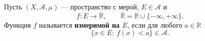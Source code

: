 \label{definition:21}

\begin{definition}
Пусть $(X,\mathcal A,\mu)$ --- пространство с мерой, $E\in\mathcal A$ и
\[
  f:E\to\overline{\mathbb R},
  \qquad \overline{\mathbb R}=\mathbb R\cup\{-\infty,+\infty\}.
\]
Функция $f$ называется \textbf{измеримой на $E$}, если для любого $a\in\mathbb R$
\[
  \{x\in E:\ f(x)<a\}\in\mathcal A.
\]
\end{definition}
